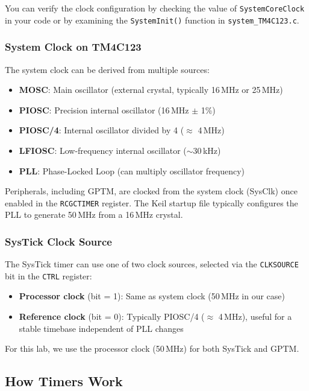 \noindent
You can verify the clock configuration by checking the value of \texttt{SystemCoreClock} in your code or by examining the \texttt{SystemInit()} function in \texttt{system\_TM4C123.c}.

\subsubsection{System Clock on TM4C123}

The system clock can be derived from multiple sources:

\begin{itemize}[nosep]
  \item \textbf{MOSC}: Main oscillator (external crystal, typically 16\,MHz or 25\,MHz)
  \item \textbf{PIOSC}: Precision internal oscillator (16\,MHz $\pm$ 1\%)
  \item \textbf{PIOSC/4}: Internal oscillator divided by 4 ($\approx$ 4\,MHz)
  \item \textbf{LFIOSC}: Low-frequency internal oscillator ($\sim$30\,kHz)
  \item \textbf{PLL}: Phase-Locked Loop (can multiply oscillator frequency)
\end{itemize}

\noindent
Peripherals, including GPTM, are clocked from the system clock (SysClk) once enabled in the \texttt{RCGCTIMER} register. The Keil startup file typically configures the PLL to generate 50\,MHz from a 16\,MHz crystal.

\subsubsection{SysTick Clock Source}

The SysTick timer can use one of two clock sources, selected via the \texttt{CLKSOURCE} bit in the \texttt{CTRL} register:

\begin{itemize}[nosep]
  \item \textbf{Processor clock} (bit = 1): Same as system clock (50\,MHz in our case)
  \item \textbf{Reference clock} (bit = 0): Typically PIOSC/4 ($\approx$ 4\,MHz), useful for a stable timebase independent of PLL changes
\end{itemize}

\noindent
For this lab, we use the processor clock (50\,MHz) for both SysTick and GPTM.

\subsection{How Timers Work}

